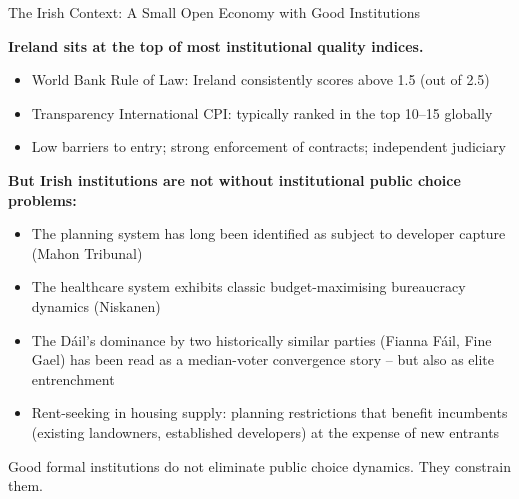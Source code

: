 \documentclass[10pt]{beamer}
\begin{document}
\begin{frame}[allowframebreaks]{The Irish Context: A Small Open Economy with Good Institutions}

\textbf{Ireland sits at the top of most institutional quality indices.}


\begin{itemize}
\item World Bank Rule of Law: Ireland consistently scores above 1.5 (out of 2.5)
\item Transparency International CPI: typically ranked in the top 10--15 globally
\item Low barriers to entry; strong enforcement of contracts; independent judiciary
\end{itemize}


\textbf{But Irish institutions are not without institutional public choice problems:}
\begin{itemize}
\item The planning system has long been identified as subject to developer capture (Mahon Tribunal)
\item The healthcare system exhibits classic budget-maximising bureaucracy dynamics (Niskanen)
\item The Dáil's dominance by two historically similar parties (Fianna Fáil, Fine Gael) has been read as a median-voter convergence story -- but also as elite entrenchment
\item Rent-seeking in housing supply: planning restrictions that benefit incumbents (existing landowners, established developers) at the expense of new entrants
\end{itemize}


\alert{Good formal institutions do not eliminate public choice dynamics. They constrain them.}
\end{frame}
\end{document}
